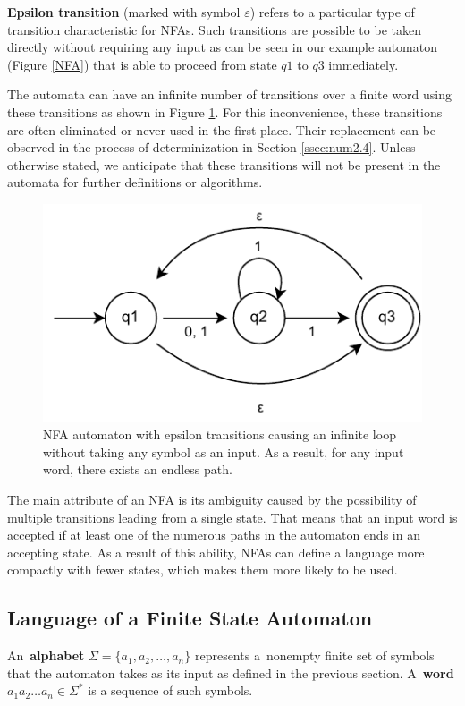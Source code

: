 \textbf{Epsilon transition} (marked with symbol $\varepsilon$) refers to a particular type of transition characteristic for NFAs. Such transitions are possible to be taken directly without requiring any input as can be seen in our example automaton (Figure \ref{NFA}) that is able to proceed from state $q1$ to $q3$ immediately.

The automata can have an infinite number of transitions over a finite word using these transitions as shown in Figure \ref{eps_cycle}. For this inconvenience, these transitions are often eliminated or never used in the first place. Their replacement can be observed in the process of determinization in Section \ref{ssec:num2.4}. Unless otherwise stated, we anticipate that these transitions will not be present in the automata for further definitions or algorithms. \\

 \begin{figure}[ht]
    \label{eps_cycle}
    \centering
    \includegraphics[width=0.5\linewidth]{obrazky-figures/epsilon_cycle.drawio.pdf}
    \caption{NFA automaton with epsilon transitions causing an infinite loop without taking any symbol as an input. As a result, for any input word, there exists an endless path.}
\end{figure}

The main attribute of an NFA is its ambiguity caused by the possibility of multiple transitions leading from a single state. That means that an input word is accepted if at least one of the numerous paths in the automaton ends in an accepting state. As a result of this ability, NFAs can define a language more compactly with fewer states, which makes them more likely to be used.


\subsection*{Language of a Finite State Automaton}
An~\textbf{alphabet} ${\Sigma=\{a_1, a_2, \dots, a_n\}}$ represents a~nonempty finite set of symbols that the automaton takes as its input as defined in the previous section. A~\textbf{word} ${a_1 a_2 \dots a_n \in \Sigma^*}$ is a sequence of such symbols.

